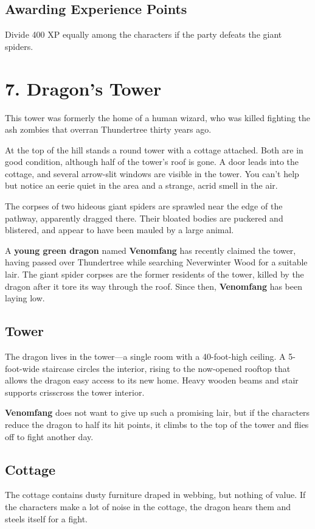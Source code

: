 \documentclass[10pt,a4paper,twoside,bg=print,twocolumn,openany,nodeprecatedcode]{dndbook}
\begin{document}
\subsection{Awarding Experience Points}
Divide 400 XP equally among the characters if the party defeats the giant spiders.

\section{7. Dragon's Tower}
This tower was formerly the home of a human wizard, who was killed fighting the ash zombies that overran Thundertree thirty years ago.

\begin{DndReadAloud}{}
At the top of the hill stands a round tower with a cottage attached. Both are in good condition, although half of the tower's roof is gone. A door leads into the cottage, and several arrow-slit windows are visible in the tower. You can't help but notice an eerie quiet in the area and a strange, acrid smell in the air.

The corpses of two hideous giant spiders are sprawled near the edge of the pathway, apparently dragged there. Their bloated bodies are puckered and blistered, and appear to have been mauled by a large animal.

\end{DndReadAloud}

A \textbf{young green dragon} named \textbf{Venomfang} has recently claimed the tower, having passed over Thundertree while searching Neverwinter Wood for a suitable lair. The giant spider corpses are the former residents of the tower, killed by the dragon after it tore its way through the roof. Since then, \textbf{Venomfang} has been laying low.

\subsection{Tower}
The dragon lives in the tower—a single room with a 40-foot-high ceiling. A 5-foot-wide staircase circles the interior, rising to the now-opened rooftop that allows the dragon easy access to its new home. Heavy wooden beams and stair supports crisscross the tower interior.

\textbf{Venomfang} does not want to give up such a promising lair, but if the characters reduce the dragon to half its hit points, it climbs to the top of the tower and flies off to fight another day.

\subsection{Cottage}
The cottage contains dusty furniture draped in webbing, but nothing of value. If the characters make a lot of noise in the cottage, the dragon hears them and steels itself for a fight.
\end{document}
